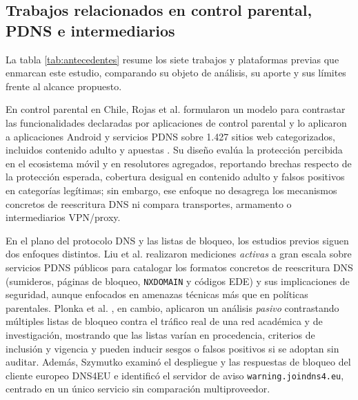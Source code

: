 \documentclass[10pt,a4paper]{article}
\begin{document}
\subsection{Trabajos relacionados en control parental, PDNS e intermediarios}

La tabla \ref{tab:antecedentes} resume los siete trabajos y plataformas previas que enmarcan este estudio, comparando su objeto de análisis, su aporte y sus límites frente al alcance propuesto.

En control parental en Chile, Rojas et al. formularon un modelo para contrastar las funcionalidades declaradas por aplicaciones de control parental \cite{rojas2025} y lo aplicaron a aplicaciones Android y servicios PDNS sobre 1.427 sitios web categorizados, incluidos contenido adulto y apuestas \cite{rojas2025ieee}. Su diseño evalúa la protección percibida en el ecosistema móvil y en resolutores agregados, reportando brechas respecto de la protección esperada, cobertura desigual en contenido adulto y falsos positivos en categorías legítimas; sin embargo, ese enfoque no desagrega los mecanismos concretos de reescritura DNS ni compara transportes, armamento o intermediarios VPN/proxy.

En el plano del protocolo DNS y las listas de bloqueo, los estudios previos siguen dos enfoques distintos. Liu et al. \cite{liu2024} realizaron mediciones \emph{activas} a gran escala sobre servicios PDNS públicos para catalogar los formatos concretos de reescritura DNS (sumideros, páginas de bloqueo, \texttt{NXDOMAIN} y códigos EDE) y sus implicaciones de seguridad, aunque enfocados en amenazas técnicas más que en políticas parentales. Plonka et al. \cite{plonka2025}, en cambio, aplicaron un análisis \emph{pasivo} contrastando múltiples listas de bloqueo contra el tráfico real de una red académica y de investigación, mostrando que las listas varían en procedencia, criterios de inclusión y vigencia y pueden inducir sesgos o falsos positivos si se adoptan sin auditar. Además, Szymutko \cite{szymutko2026} examinó el despliegue y las respuestas de bloqueo del cliente europeo DNS4EU e identificó el servidor de aviso \texttt{warning.joindns4.eu}, centrado en un único servicio sin comparación multiproveedor.
\end{document}
